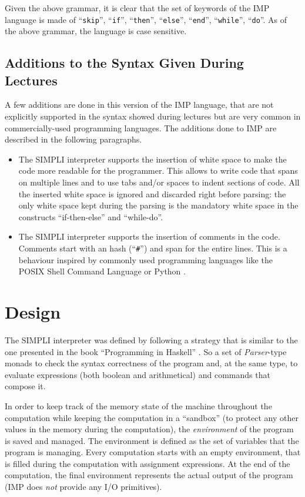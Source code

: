 \documentclass{esposito-documentation}
\begin{document}
Given the above grammar, it is clear that the set of keywords of the IMP
language is made of ``\texttt{skip}'', ``\texttt{if}'', ``\texttt{then}'',
``\texttt{else}'', ``\texttt{end}'', ``\texttt{while}'', ``\texttt{do}''. As of
the above grammar, the language is case sensitive.

\section{Additions to the Syntax Given During Lectures}\label{sec:additions}

A few additions are done in this version of the IMP language, that are not
explicitly supported in the syntax showed during lectures but are very common
in commercially-used programming languages. The additions done to IMP are
described in the following paragraphs.

\begin{itemize}
	\item The SIMPLI interpreter supports the insertion of white space to make
		the code more readable for the programmer. This allows to write code
		that spans on multiple lines and to use tabs and/or spaces to indent
		sections of code. All the inserted white space is ignored and discarded
		right before parsing: the only white space kept during the parsing is
		the mandatory white space in the constructs ``if-then-else'' and
		``while-do''.
	\item The SIMPLI interpreter supports the insertion of comments in the
		code. Comments start with an hash (``\texttt{\#}'') and span for the
		entire lines. This is a behaviour inspired by commonly used programming
		languages like the POSIX Shell Command Language \cite{shell-syntax} or
		Python \cite{python-syntax}.
\end{itemize}

\chapter{Design}

The SIMPLI interpreter was defined by following a strategy that is similar to
the one presented in the book ``Programming in Haskell'' \cite{Hutton2017}. So
a set of \emph{Parser}-type monads to check the syntax correctness of the
program and, at the same type, to evaluate expressions (both boolean and
arithmetical) and commands that compose it.

In order to keep track of the memory state of the machine throughout the
computation while keeping the computation in a ``sandbox'' (to protect any
other values in the memory during the computation), the \emph{environment} of
the program is saved and managed. The environment is defined as the set of
variables that the program is managing. Every computation starts with an empty
environment, that is filled during the computation with assignment expressions.
At the end of the computation, the final environment represents the actual
output of the program (IMP does \emph{not} provide any I/O primitives).
\end{document}
